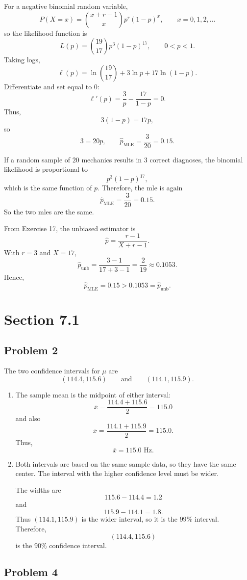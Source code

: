 \documentclass[11pt]{article}
\begin{document}
For a negative binomial random variable,
\[
P(X=x)=\binom{x+r-1}{x}p^r(1-p)^x, \qquad x=0,1,2,\dots
\]
so the likelihood function is
\[
L(p)=\binom{19}{17}p^3(1-p)^{17}, \qquad 0<p<1.
\]
Taking logs,
\[
\ell(p)=\ln\binom{19}{17}+3\ln p+17\ln(1-p).
\]
Differentiate and set equal to $0$:
\[
\ell'(p)=\frac{3}{p}-\frac{17}{1-p}=0.
\]
Thus,
\[
3(1-p)=17p,
\]
so
\[
3=20p, \qquad \hat{p}_{\text{MLE}}=\frac{3}{20}=0.15.
\]

If a random sample of $20$ mechanics results in $3$ correct diagnoses, the binomial likelihood is proportional to
\[
p^3(1-p)^{17},
\]
which is the same function of $p$. Therefore, the mle is again
\[
\hat{p}_{\text{MLE}}=\frac{3}{20}=0.15.
\]
So the two mles are the same.

From Exercise 17, the unbiased estimator is
\[
\hat{p}=\frac{r-1}{X+r-1}.
\]
With $r=3$ and $X=17$,
\[
\hat{p}_{\text{unb}}=\frac{3-1}{17+3-1}=\frac{2}{19}\approx 0.1053.
\]
Hence,
\[
\hat{p}_{\text{MLE}}=0.15 > 0.1053=\hat{p}_{\text{unb}}.
\]

\section*{Section 7.1}

\subsection*{Problem 2}

The two confidence intervals for $\mu$ are
\[
(114.4,115.6) \qquad \text{and} \qquad (114.1,115.9).
\]

\begin{enumerate}
\item[(a)] The sample mean is the midpoint of either interval:
\[
\bar{x}=\frac{114.4+115.6}{2}=115.0
\]
and also
\[
\bar{x}=\frac{114.1+115.9}{2}=115.0.
\]
Thus,
\[
\bar{x}=115.0\text{ Hz}.
\]

\item[(b)] Both intervals are based on the same sample data, so they have the same center. The interval with the higher confidence level must be wider.

The widths are
\[
115.6-114.4=1.2
\]
and
\[
115.9-114.1=1.8.
\]
Thus $(114.1,115.9)$ is the wider interval, so it is the $99\%$ interval. Therefore,
\[
(114.4,115.6)
\]
is the $90\%$ confidence interval.
\end{enumerate}

\subsection*{Problem 4}
\end{document}
